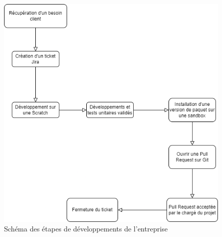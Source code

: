 \documentclass[12pt,oneside,noprintercorrection]{iut}
\begin{document}
 \begin{figure}[!ht]
  \centering
  \includegraphics[width=15cm]{img/schemaEtapesDev.drawio.png}
  \caption{Schéma des étapes de développements de l'entreprise}
\end{figure}
\clearpage
 
 
\end{document}
